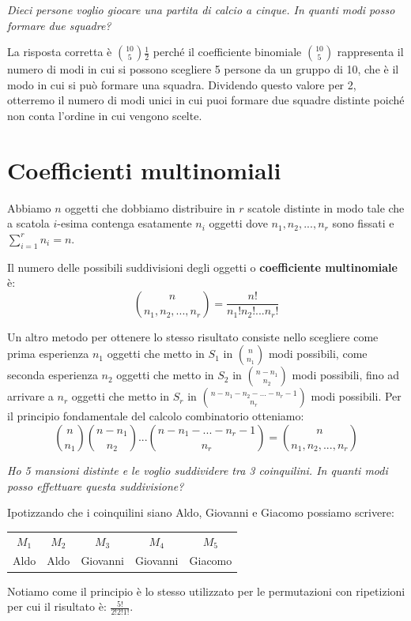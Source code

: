 \begin{Example}{}{}
    \textit{Dieci persone voglio giocare una partita di calcio a cinque. In quanti modi posso formare due squadre?}

    La risposta corretta è $\binom{10}{5}\frac{1}{2}$ perché il coefficiente binomiale $\binom{10}{5}$ rappresenta il numero di modi in cui si possono scegliere 5 persone da un gruppo di 10, che è il modo in cui si può formare una squadra. Dividendo questo valore per 2, otterremo il numero di modi unici in cui puoi formare due squadre distinte poiché non conta l'ordine in cui vengono scelte.
\end{Example}

\section{Coefficienti multinomiali}
Abbiamo $n$ oggetti che dobbiamo distribuire in $r$ scatole distinte in modo tale che a scatola $i$-esima contenga esatamente $n_i$ oggetti dove $n_1,n_2,...,n_r$ sono fissati e $\sum^r_{i=1}n_i=n$.

\begin{redbar}
    Il numero delle possibili suddivisioni degli oggetti o \textbf{coefficiente multinomiale} è:
    \begin{equation*}
        \binom{n}{n_1,n_2,...,n_r}=\frac{n!}{n_1!n_2!...n_r!}
    \end{equation*}
\end{redbar}
Un altro metodo per ottenere lo stesso risultato consiste nello scegliere come prima esperienza $n_1$ oggetti che metto in $S_1$ in $\binom{n}{n_1}$ modi possibili, come seconda esperienza $n_2$ oggetti che metto in $S_2$ in $\binom{n-n_1}{n_2}$ modi possibili, fino ad arrivare a $n_r$ oggetti che metto in $S_r$ in $\binom{n-n_1-n_2-...-n_r-1}{n_r}$ modi possibili. Per il principio fondamentale del calcolo combinatorio otteniamo:
\begin{equation*}
    \binom{n}{n_1}\binom{n-n_1}{n_2}...\binom{n-n_1-...-n_r-1}{n_r} = \binom{n}{n_1,n_2,...,n_r}
\end{equation*}

\begin{Example}{}{}
    \textit{Ho 5 mansioni distinte e le voglio suddividere tra 3 coinquilini. In quanti modi posso effettuare questa suddivisione?}
    
    Ipotizzando che i coinquilini siano Aldo, Giovanni e Giacomo possiamo scrivere:
    \begin{tabular}{|c|c|c|c|c|}
        \hline$M_1$ & $M_2$ & $M_3$ & $M_4$ & $M_5$\\
        Aldo & Aldo & Giovanni & Giovanni & Giacomo\\\hline
    \end{tabular}

    Notiamo come il principio è lo stesso utilizzato per le permutazioni con ripetizioni per cui il risultato è: $\frac{5!}{2!2!1!}$.
\end{Example}

